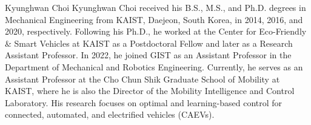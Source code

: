 \documentclass[lettersize,journal]{IEEEtran}
\newcommand*{\template}{..}
\begin{document}
\begin{IEEEbiography}{Kyunghwan Choi}
    Kyunghwan Choi received his B.S., M.S., and Ph.D. degrees in Mechanical Engineering from KAIST, Daejeon, South Korea, in 2014, 2016, and 2020, respectively. Following his Ph.D., he worked at the Center for Eco-Friendly \& Smart Vehicles at KAIST as a Postdoctoral Fellow and later as a Research Assistant Professor. In 2022, he joined GIST as an Assistant Professor in the Department of Mechanical and Robotics Engineering. Currently, he serves as an Assistant Professor at the Cho Chun Shik Graduate School of Mobility at KAIST, where he is also the Director of the Mobility Intelligence and Control Laboratory. His research focuses on optimal and learning-based control for connected, automated, and electrified vehicles (CAEVs).
\end{IEEEbiography}
\end{document}
